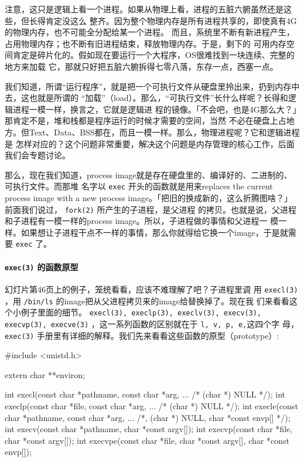 \documentclass{wx672ctexart}
\newcommand\mpic[1]{%
  \marginpar{\texttt{[image: thumbnails/\#1]}}}
\begin{document}
注意，这只是逻辑上看一个进程。如果从物理上看，进程的五脏六腑虽然还是这些，但长得肯定没这么
整齐。因为整个物理内存是所有进程共享的，即使真有4G的物理内存，也不可能全分配给某一个进程。
而且，系统里不断有新进程产生，占用物理内存；也不断有旧进程结束，释放物理内存。于是，剩下的
可用内存空间肯定是碎片化的。假如现在要运行一个大程序，OS很难找到一块连续、完整的地方来加载
它，那就只好把五脏六腑拆得七零八落，东存一点，西塞一点。

我们知道，所谓“运行程序”，就是把一个可执行文件从硬盘里拎出来，扔到内存中去，这也就是所谓的
“加载”（load）。那么，“可执行文件”长什么样呢？长得和逻辑进程一模一样，换言之，它就是逻辑进
程的镜像。「不会吧，也是4G那么大？」那肯定不是，堆和栈都是程序运行的时候才需要的空间，当然
不必在硬盘上占地方。但Text、Data、BSS都在，而且一模一样。那么，物理进程呢？它和逻辑进程是
怎样对应的？这个问题非常重要，解决这个问题是内存管理的核心工作，后面我们会专题讨论。

那么，现在我们知道，process image就是存在硬盘里的、编译好的、二进制的、可执行文件。而那堆
名字以 \texttt{exec} 开头的函数就是用来replaces the current process image with a new process
image。「把旧的换成新的，这么折腾图啥？」前面我们说过， \texttt{fork(2)} 所产生的子进程，是父进程
的拷贝。也就是说，父进程和子进程有一模一样的process image。所以，子进程做的事情和父进程一
模一样。如果想让子进程干点不一样的事情，那么你就得给它换一个image，于是就需要 \texttt{exec} 了。

\paragraph{\texttt{exec(3)} 的函数原型}
\label{sec:org9f6236d}

\mpic{pg_0046}幻灯片第46页上的例子，笼统看看，应该不难理解了吧？子进程里调
用 \texttt{execl(3)} ，用 \texttt{/bin/ls} 的image把从父进程拷贝来的image给替换掉了。现在我
们来看看这个小例子里面的细节。 \texttt{execl(3), execlp(3), execlv(3), execv(3),
  execvp(3), execve(3)} ，这一系列函数的区别就在于 \texttt{l, v, p, e,}这四个字
母， \texttt{exec(3)} 手册里有详细的解释。我们先来看看这些函数的原型（prototype）:
\begin{ccode}
#include <unistd.h>

extern char **environ;

int execl(const char *pathname, const char *arg, ...
				/* (char  *) NULL */);
int execlp(const char *file, const char *arg, ...
				/* (char  *) NULL */);
int execle(const char *pathname, const char *arg, ...
				/*, (char *) NULL, char *const envp[] */);
int execv(const char *pathname, char *const argv[]);
int execvp(const char *file, char *const argv[]);
int execvpe(const char *file, char *const argv[],
				char *const envp[]);
\end{ccode}
\end{document}

